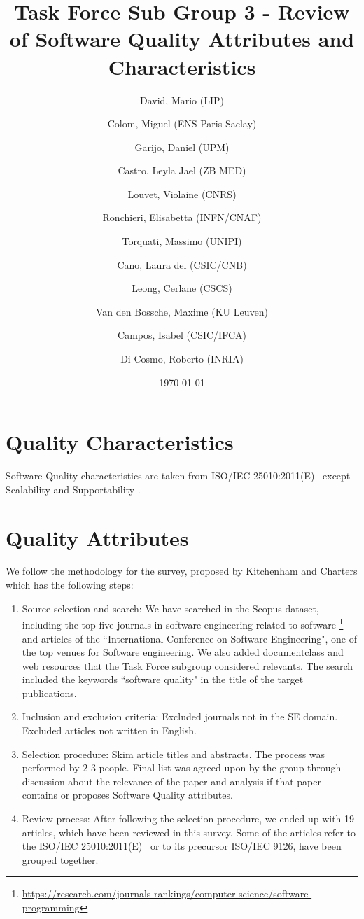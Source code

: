 \documentclass[a4paper]{article}
\title{Task Force Sub Group 3 - Review of Software Quality Attributes and Characteristics}
\author{
    David, Mario (LIP) \orcidlink{0000-0003-1802-5356} \and
    Colom, Miguel (ENS Paris-Saclay) \orcidlink{0000-0003-2636-0656} \and
    Garijo, Daniel (UPM) \orcidlink{0000-0003-0454-7145} \and
    Castro, Leyla Jael (ZB MED) \orcidlink{0000-0003-3986-0510} \and
    Louvet, Violaine (CNRS) \orcidlink{0000-0002-8742-8952} \and
    Ronchieri, Elisabetta (INFN/CNAF) \orcidlink{0000-0002-7341-6491} \and
    Torquati, Massimo (UNIPI) \orcidlink{0000-0001-6323-3459} \and
    Cano, Laura del (CSIC/CNB) \orcidlink{0000-0003-0981-2040} \and
    Leong, Cerlane (CSCS)  \orcidlink{0000-0001-8241-6277} \and
    Van den Bossche, Maxime (KU Leuven) \orcidlink{0000-0002-0938-0156} \and
    Campos, Isabel (CSIC/IFCA) \orcidlink{0000-0002-9350-0383} \and
    Di Cosmo, Roberto (INRIA) \orcidlink{0000-0002-7493-5349}
}
\date{\today}
\begin{document}
\maketitle
\tableofcontents

\newpage
\section{Quality Characteristics}

Software Quality characteristics are taken from ISO/IEC 25010:2011(E)~\cite{iso_25010_2011_2017} except Scalability and
Supportability \cite{microsoft_2010}.



\newpage
\section{Quality Attributes}

We follow the methodology for the survey, proposed by Kitchenham and Charters \cite{keele2007guidelines} which has the following steps:

\begin{enumerate}
    \item Source selection and search: We have searched in the Scopus dataset, including the top five journals in
    software engineering related to software \footnote{\url{https://research.com/journals-rankings/computer-science/software-programming}}
    and articles of the  ``International Conference on Software Engineering", one of the top venues for Software engineering. We also added documentclass
    and web resources that the Task Force subgroup considered relevants.
    The search included the keywords ``software quality" in the title of the target publications.
    \item Inclusion and exclusion criteria: Excluded journals not in the SE domain. Excluded articles not written in English.
    \item Selection procedure: Skim article titles and abstracts. The process was performed by 2-3 people. Final list was agreed upon by the group through discussion
    about the relevance of the paper and analysis if that paper contains or proposes Software Quality attributes.
    \item Review process: After following the selection procedure, we ended up with 19 articles, which have been reviewed in this survey. Some of the articles
    refer to the ISO/IEC 25010:2011(E)~\cite{iso_25010_2011_2017} or to its precursor ISO/IEC 9126, have been grouped together.
\end{enumerate}
\end{document}
